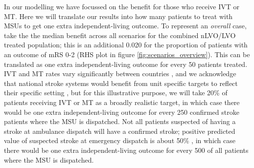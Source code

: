 In our modelling we have focussed on the benefit for those who receive IVT or MT. Here we will translate our results into how many patients to treat with MSUs to get one extra independent-living outcome. To represent an \emph{overall} case, take the the median benefit across all scenarios for the combined nLVO/LVO treated population; this is an additional 0.020 for the proportion of patients with an outcome of mRS 0-2 (RHS plot in figure \ref{fig:scenarios_overview}). This can be translated as one extra independent-living outcome for every 50 patients treated. IVT and MT rates vary significantly between countries \cite{kim_global_2024}, and we acknowledge that national stroke systems would benefit from unit specific targets to reflect their specific setting \cite{OUR PAPER, BUT NEED TO FIND OUT WHICH ONE}, but for this illustrative purpose, we will take 20\% of patients receiving IVT or MT as a broadly realistic target, in which case there would be one extra independent-living outcome for every 250 confirmed stroke patients where the MSU is dispatched. Not all patients suspected of having a stroke at ambulance dispatch will have a confirmed stroke; positive predicted value of suspected stroke at emergency dispatch is about 50\% \cite{wenstrup_emergency_2024}, in which case there would be one extra independent-living outcome for every 500 of all patients where the MSU is dispatched.
